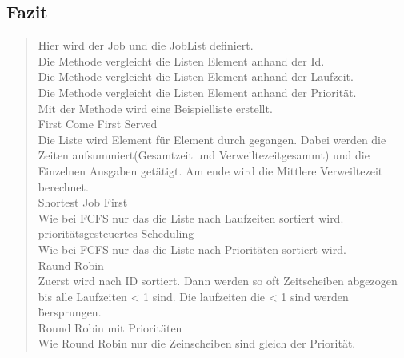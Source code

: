	\subsection{Fazit}
		\begin{quote}
			
			Hier wird der Job und die JobList definiert.\\
			
			
			Die Methode vergleicht die Listen Element anhand der Id.\\
			
			
			Die Methode vergleicht die Listen Element anhand der Laufzeit.\\
			
			
			Die Methode vergleicht die Listen Element anhand der Priorit\"at.\\
			
			
			Mit der Methode wird eine Beispielliste erstellt.\\
			First Come First Served\\
			
			Die Liste wird Element f\"ur Element durch gegangen. Dabei werden die Zeiten aufsummiert(Gesamtzeit und Verweiltezeitgesammt) und die Einzelnen Ausgaben get\"atigt. Am ende wird die Mittlere Verweiltezeit berechnet.\\
			Shortest Job First\\
			
			Wie bei FCFS nur das die Liste nach Laufzeiten sortiert wird.
			priorit\"atsgesteuertes Scheduling\\
			
			Wie bei FCFS nur das die Liste nach Priorit\"aten sortiert wird.\\
			Raund Robin\\
			
			Zuerst wird nach ID sortiert. Dann werden so oft Zeitscheiben abgezogen bis alle Laufzeiten < 1 sind. Die laufzeiten die < 1 sind werden \"bersprungen.\\
			Round Robin mit Priorit\"aten\\
			
			
			Wie Round Robin nur die Zeinscheiben sind gleich der Priorit\"at.\\
		\end{quote}
